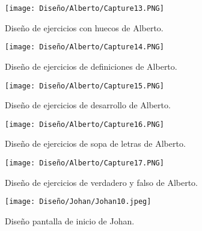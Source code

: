 \begin{figure}[ht!]
  \centering
\texttt{[image: Diseño/Alberto/Capture13.PNG]}
  \caption{Diseño de ejercicios con huecos de Alberto.}
  
  
\end{figure}
\begin{figure}[ht!]
  \centering
\texttt{[image: Diseño/Alberto/Capture14.PNG]}
  \caption{Diseño de ejercicios de definiciones de Alberto.}
  
  
\end{figure}
\begin{figure}[ht!]
  \centering
\texttt{[image: Diseño/Alberto/Capture15.PNG]}
  \caption{Diseño de ejercicios de desarrollo de Alberto.}
  
 
\end{figure}
\begin{figure}[ht!]
  \centering
\texttt{[image: Diseño/Alberto/Capture16.PNG]}
  \caption{Diseño de ejercicios de sopa de letras de Alberto.}
  
  
\end{figure}
\begin{figure}[ht!]
  \centering
\texttt{[image: Diseño/Alberto/Capture17.PNG]}
  \caption{Diseño de ejercicios de verdadero y falso de Alberto.}
  
 
\end{figure}
















































\begin{figure}[ht!]
    \centering
    \texttt{[image: Diseño/Johan/Johan10.jpeg]}
    \caption{Diseño pantalla de inicio de Johan.}
    \label{Johan10}
  \end{figure}
  
